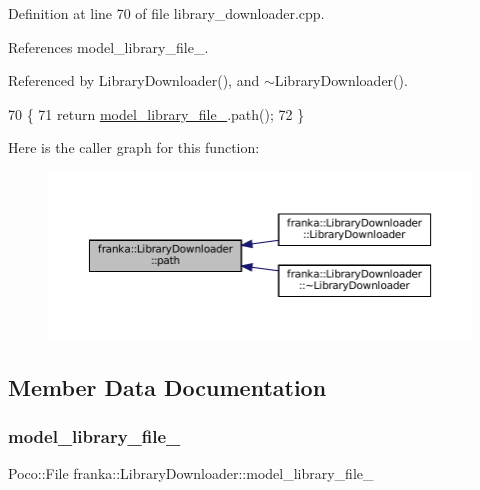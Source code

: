 Definition at line 70 of file library\+\_\+downloader.\+cpp.



References model\+\_\+library\+\_\+file\+\_\+.



Referenced by Library\+Downloader(), and $\sim$\+Library\+Downloader().


\begin{DoxyCode}
70                                                         \{
71   \textcolor{keywordflow}{return} \hyperlink{classfranka_1_1LibraryDownloader_a40ea4c7b49484ed554b915e4d1df24f7}{model\_library\_file\_}.path();
72 \}
\end{DoxyCode}
Here is the caller graph for this function\+:
\nopagebreak
\begin{figure}[H]
\begin{center}
\leavevmode
\includegraphics[width=350pt]{classfranka_1_1LibraryDownloader_ac33161b97cad34550de02c67f4feb15c_icgraph}
\end{center}
\end{figure}


\subsection{Member Data Documentation}
\mbox{\label{classfranka_1_1LibraryDownloader_a40ea4c7b49484ed554b915e4d1df24f7}} 
\subsubsection{\texorpdfstring{model\+\_\+library\+\_\+file\+\_\+}{model\_library\_file\_}}
{\footnotesize\ttfamily Poco\+::\+File franka\+::\+Library\+Downloader\+::model\+\_\+library\+\_\+file\+\_\+\hspace{0.3cm}{\ttfamily [private]}}



